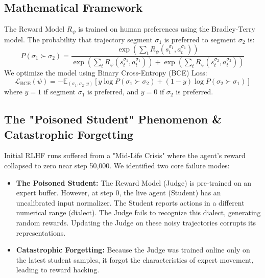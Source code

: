 \documentclass[11pt,a4paper]{article}
\begin{document}
\subsection{Mathematical Framework}
The Reward Model $R_\psi$ is trained on human preferences using the Bradley-Terry model. The probability that trajectory segment $\sigma_1$ is preferred to segment $\sigma_2$ is:
\begin{equation}
P(\sigma_1 \succ \sigma_2) = \frac{\exp\left(\sum_{t} R_\psi(s_t^{\sigma_1}, a_t^{\sigma_1})\right)}{\exp\left(\sum_{t} R_\psi(s_t^{\sigma_1}, a_t^{\sigma_1})\right) + \exp\left(\sum_{t} R_\psi(s_t^{\sigma_2}, a_t^{\sigma_2})\right)}
\end{equation}
We optimize the model using Binary Cross-Entropy (BCE) Loss:
\begin{equation}
\mathcal{L}_{\text{BCE}}(\psi) = - \mathbb{E}_{(\sigma_1, \sigma_2, y)} \left[ y \log P(\sigma_1 \succ \sigma_2) + (1-y) \log P(\sigma_2 \succ \sigma_1) \right]
\end{equation}
where $y=1$ if segment $\sigma_1$ is preferred, and $y=0$ if $\sigma_2$ is preferred.

\subsection{The "Poisoned Student" Phenomenon \& Catastrophic Forgetting}
Initial RLHF runs suffered from a "Mid-Life Crisis" where the agent's reward collapsed to zero near step 50,000. We identified two core failure modes:
\begin{itemize}
    \item \textbf{The Poisoned Student:} The Reward Model (Judge) is pre-trained on an expert buffer. However, at step 0, the live agent (Student) has an uncalibrated input normalizer. The Student reports actions in a different numerical range (dialect). The Judge fails to recognize this dialect, generating random rewards. Updating the Judge on these noisy trajectories corrupts its representations.
    \item \textbf{Catastrophic Forgetting:} Because the Judge was trained online only on the latest student samples, it forgot the characteristics of expert movement, leading to reward hacking.
\end{itemize}
\end{document}
